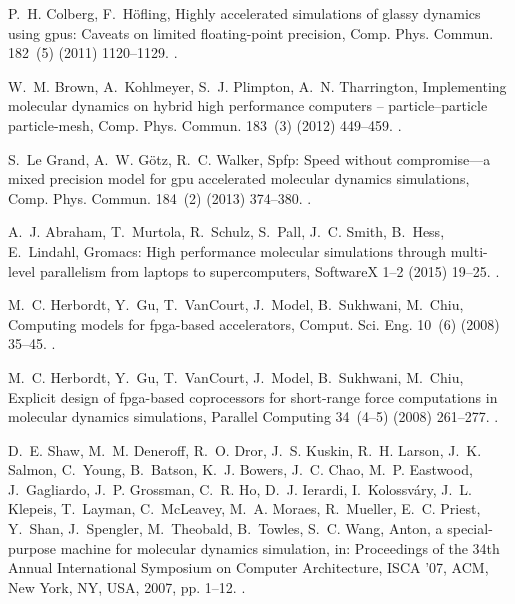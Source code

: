 \documentclass[preprint]{elsarticle}
\begin{document}
\begin{thebibliography}{10}
P.~H. Colberg, F.~H\"ofling, Highly accelerated simulations of glassy dynamics
  using gpus: Caveats on limited floating-point precision, Comp. Phys. Commun.
  182~(5) (2011) 1120--1129.
\newblock \href {https://doi.org/10.1016/j.cpc.2011.01.009}
  {}.

W.~M. Brown, A.~Kohlmeyer, S.~J. Plimpton, A.~N. Tharrington, Implementing
  molecular dynamics on hybrid high performance computers –
  particle–particle particle-mesh, Comp. Phys. Commun. 183~(3) (2012)
  449--459.
\newblock \href {https://doi.org/10.1016/j.cpc.2011.10.012}
  {}.

S.~{Le Grand}, A.~W. G\"otz, R.~C. Walker, Spfp: Speed without compromise—a
  mixed precision model for gpu accelerated molecular dynamics simulations,
  Comp. Phys. Commun. 184~(2) (2013) 374--380.
\newblock \href {https://doi.org/10.1016/j.cpc.2012.09.022}
  {}.

A.~J. Abraham, T.~Murtola, R.~Schulz, S.~Pall, J.~C. Smith, B.~Hess,
  E.~Lindahl, Gromacs: High performance molecular simulations through
  multi-level parallelism from laptops to supercomputers, SoftwareX 1--2 (2015)
  19--25.
\newblock \href {https://doi.org/10.1016/j.softx.2015.06.001}
  {}.

M.~C. Herbordt, Y.~Gu, T.~VanCourt, J.~Model, B.~Sukhwani, M.~Chiu, Computing
  models for fpga-based accelerators, Comput. Sci. Eng. 10~(6) (2008) 35--45.
\newblock \href {https://doi.org/10.1109/MCSE.2008.143}
  {}.

M.~C. Herbordt, Y.~Gu, T.~VanCourt, J.~Model, B.~Sukhwani, M.~Chiu, Explicit
  design of fpga-based coprocessors for short-range force computations in
  molecular dynamics simulations, Parallel Computing 34~(4--5) (2008) 261--277.
\newblock \href {https://doi.org/10.1016/j.parco.2008.01.007}
  {}.

D.~E. Shaw, M.~M. Deneroff, R.~O. Dror, J.~S. Kuskin, R.~H. Larson, J.~K.
  Salmon, C.~Young, B.~Batson, K.~J. Bowers, J.~C. Chao, M.~P. Eastwood,
  J.~Gagliardo, J.~P. Grossman, C.~R. Ho, D.~J. Ierardi, I.~Kolossv\'{a}ry,
  J.~L. Klepeis, T.~Layman, C.~McLeavey, M.~A. Moraes, R.~Mueller, E.~C.
  Priest, Y.~Shan, J.~Spengler, M.~Theobald, B.~Towles, S.~C. Wang, Anton, a
  special-purpose machine for molecular dynamics simulation, in: Proceedings of
  the 34th Annual International Symposium on Computer Architecture, ISCA '07,
  ACM, New York, NY, USA, 2007, pp. 1--12.
\newblock \href {https://doi.org/10.1145/1250662.1250664}
  {}.


\end{thebibliography}
\end{document}
